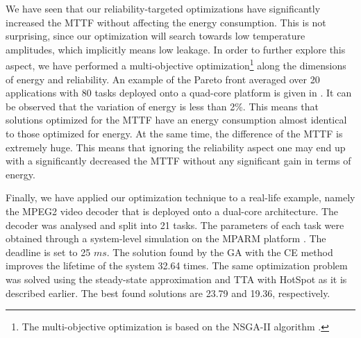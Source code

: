 We have seen that our reliability-targeted optimizations have significantly increased the MTTF without affecting the energy consumption. This is not surprising, since our optimization will search towards low temperature amplitudes, which implicitly means low leakage. In order to further explore this aspect, we have performed a multi-objective optimization\footnote{The multi-objective optimization is based on the NSGA-II algorithm \cite{deb2002}.} along the dimensions of energy and reliability. An example of the Pareto front averaged over 20 applications with 80 tasks deployed onto a quad-core platform is given in . It can be observed that the variation of energy is less than 2\%. This means that solutions optimized for the MTTF have an energy consumption almost identical to those optimized for energy. At the same time, the difference of the MTTF is extremely huge. This means that ignoring the reliability aspect one may end up with a significantly decreased the MTTF without any significant gain in terms of energy.

Finally, we have applied our optimization technique to a real-life example, namely the MPEG2 video decoder \cite{ffmpeg2011} that is deployed onto a dual-core architecture. The decoder was analysed and split into 21 tasks. The parameters of each task were obtained through a system-level simulation on the MPARM platform \cite{benini2005}. The deadline is set to 25 $ms$. The solution found by the GA with the CE method improves the lifetime of the system 32.64 times. The same optimization problem was solved using the steady-state approximation and TTA with HotSpot as it is described earlier. The best found solutions are 23.79 and 19.36, respectively.
